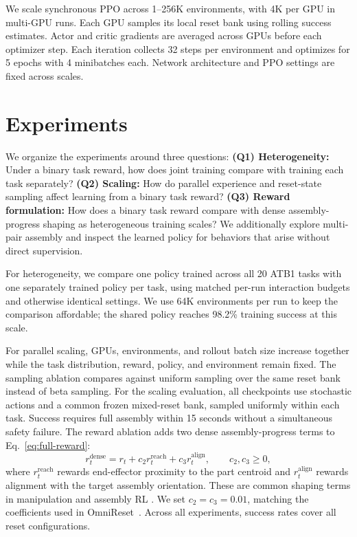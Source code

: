 We scale synchronous PPO across 1--256K environments, with 4K per GPU
in multi-GPU runs. Each GPU samples its local reset bank using rolling
success estimates. Actor and critic gradients are averaged across GPUs
before each optimizer step. 
Each iteration collects 32 steps per environment and optimizes for 5
epochs with 4 minibatches each. Network architecture and PPO settings
are fixed across scales.

\section{Experiments}
\label{sec:experiments}
We organize the experiments around three questions:
\textbf{(Q1) Heterogeneity:} Under a binary task reward, how does joint
training compare with training each task separately?
\textbf{(Q2) Scaling:} How do parallel experience and reset-state sampling
affect learning from a binary task reward?
\textbf{(Q3) Reward formulation:} How does a binary task reward compare
with dense assembly-progress shaping as heterogeneous training scales?
We additionally explore multi-pair assembly and inspect the learned policy
for behaviors that arise without direct supervision.

For heterogeneity, we compare one policy trained across all 20 ATB1 tasks
with one separately trained policy per task, using matched per-run
interaction budgets and otherwise identical settings. We use 64K environments
per run to keep the comparison affordable; the shared policy reaches
98.2\% training success at this scale.

For parallel scaling, GPUs, environments, and rollout batch size increase
together while the task distribution, reward, policy, and environment remain
fixed. The sampling ablation compares against uniform sampling over the same reset
bank instead of beta sampling.
For the scaling evaluation, all checkpoints use stochastic actions and a common
frozen mixed-reset bank, sampled uniformly within each task. Success requires
full assembly within 15 seconds without a simultaneous safety failure.
The reward ablation adds two dense assembly-progress terms to
Eq.~\eqref{eq:full-reward}: 
\begin{equation}
    r_t^{\mathrm{dense}} = r_t +
    c_2 r_t^{\mathrm{reach}} + c_3 r_t^{\mathrm{align}},
    \qquad c_2,c_3 \geq 0,
    \label{eq:reward-ablation}
\end{equation}
where $r_t^{\mathrm{reach}}$ rewards end-effector proximity to the part 
centroid and $r_t^{\mathrm{align}}$ rewards alignment with the target assembly
orientation. These are common shaping terms in manipulation and assembly RL
\cite{narang2022factory,tang2024automate,yin2026omnireset}.
We set $c_2=c_3=0.01$, matching the coefficients used in
OmniReset~\cite{yin2026omnireset}.
Across all experiments, success rates cover all reset configurations.

